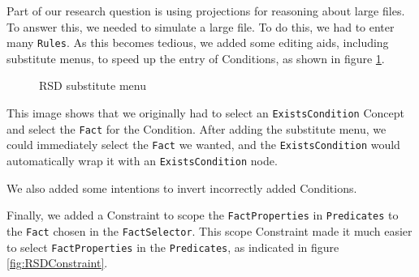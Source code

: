 Part of our research question is using projections for reasoning about large files.
To answer this, we needed to simulate a large file.
To do this, we had to enter many \texttt{Rules}.
As this becomes tedious, we added some editing aids, including substitute menus, to speed up the entry of Conditions, as shown in figure \ref{fig:RSDSubstituteMenu}.

\begin{figure}
    \centering
    \caption{RSD substitute menu}
    \label{fig:RSDSubstituteMenu}
\end{figure}

This image shows that we originally had to select an \texttt{ExistsCondition} Concept and select the \texttt{Fact} for the Condition.
After adding the substitute menu, we could immediately select the \texttt{Fact} we wanted, and the \texttt{ExistsCondition} would automatically wrap it with an \texttt{ExistsCondition} node.

We also added some intentions to invert incorrectly added Conditions.

Finally, we added a Constraint to scope the \texttt{FactProperties} in \texttt{Predicates} to the \texttt{Fact} chosen in the \texttt{FactSelector}.
This scope Constraint made it much easier to select \texttt{FactProperties} in the \texttt{Predicates}, as indicated in figure \ref{fig:RSDConstraint}.

